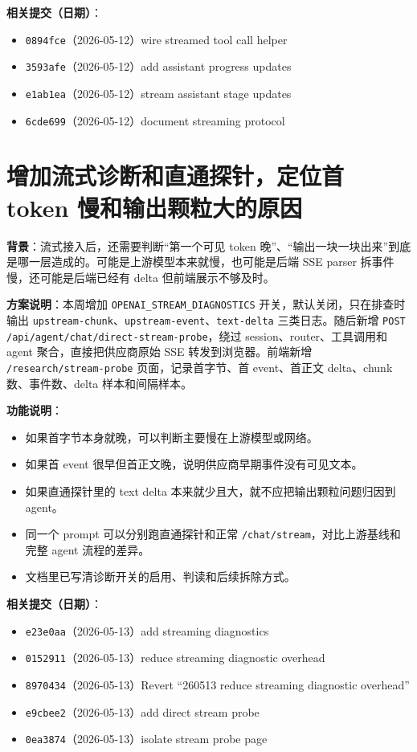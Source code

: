 \documentclass[UTF8]{ctexart}
\begin{document}
\textbf{相关提交（日期）}：
\begin{itemize}
\item \texttt{0894fce}（2026-05-12）wire streamed tool call helper
\item \texttt{3593afe}（2026-05-12）add assistant progress updates
\item \texttt{e1ab1ea}（2026-05-12）stream assistant stage updates
\item \texttt{6cde699}（2026-05-12）document streaming protocol
\end{itemize}

\section{增加流式诊断和直通探针，定位首 token 慢和输出颗粒大的原因}

\textbf{背景}：流式接入后，还需要判断``第一个可见 token 晚''、``输出一块一块出来''到底是哪一层造成的。可能是上游模型本来就慢，也可能是后端 SSE parser 拆事件慢，还可能是后端已经有 delta 但前端展示不够及时。

\textbf{方案说明}：本周增加 \texttt{OPENAI\_STREAM\_DIAGNOSTICS} 开关，默认关闭，只在排查时输出 \texttt{upstream-chunk}、\texttt{upstream-event}、\texttt{text-delta} 三类日志。随后新增 \texttt{POST /api/agent/chat/direct-stream-probe}，绕过 session、router、工具调用和 agent 聚合，直接把供应商原始 SSE 转发到浏览器。前端新增 \texttt{/research/stream-probe} 页面，记录首字节、首 event、首正文 delta、chunk 数、事件数、delta 样本和间隔样本。

\textbf{功能说明}：
\begin{itemize}
\item 如果首字节本身就晚，可以判断主要慢在上游模型或网络。
\item 如果首 event 很早但首正文晚，说明供应商早期事件没有可见文本。
\item 如果直通探针里的 text delta 本来就少且大，就不应把输出颗粒问题归因到 agent。
\item 同一个 prompt 可以分别跑直通探针和正常 \texttt{/chat/stream}，对比上游基线和完整 agent 流程的差异。
\item 文档里已写清诊断开关的启用、判读和后续拆除方式。
\end{itemize}

\textbf{相关提交（日期）}：
\begin{itemize}
\item \texttt{e23e0aa}（2026-05-13）add streaming diagnostics
\item \texttt{0152911}（2026-05-13）reduce streaming diagnostic overhead
\item \texttt{8970434}（2026-05-13）Revert ``260513 reduce streaming diagnostic overhead''
\item \texttt{e9cbee2}（2026-05-13）add direct stream probe
\item \texttt{0ea3874}（2026-05-13）isolate stream probe page
\end{itemize}
\end{document}
